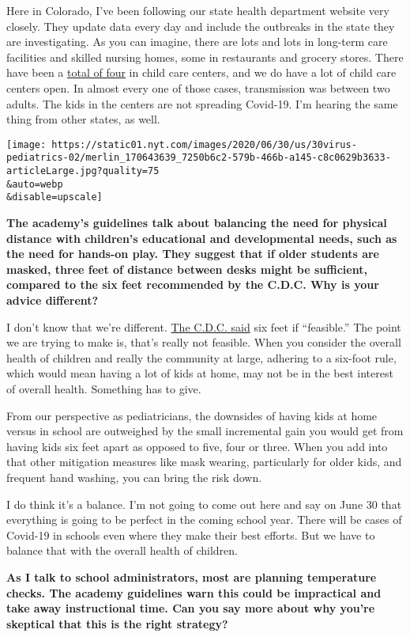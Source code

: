 Here in Colorado, I've been following our state health department
website very closely. They update data every day and include the
outbreaks in the state they are investigating. As you can imagine, there
are lots and lots in long-term care facilities and skilled nursing
homes, some in restaurants and grocery stores. There have been a
\href{https://covid19.colorado.gov/data/outbreak-data}{total of four} in
child care centers, and we do have a lot of child care centers open. In
almost every one of those cases, transmission was between two adults.
The kids in the centers are not spreading Covid-19. I'm hearing the same
thing from other states, as well.

\texttt{[image: https://static01.nyt.com/images/2020/06/30/us/30virus-pediatrics-02/merlin\_170643639\_7250b6c2-579b-466b-a145-c8c0629b3633-articleLarge.jpg?quality=75\\\&auto=webp\\\&disable=upscale]}

\textbf{The academy's guidelines talk about balancing the need for
physical distance with children's educational and developmental needs,
such as the need for hands-on play. They suggest that if older students
are masked, three feet of distance between desks might be sufficient,
compared to the six feet recommended by the C.D.C. Why is your advice
different?}

I don't know that we're different.
\href{https://www.cdc.gov/coronavirus/2019-ncov/community/schools-childcare/schools.html}{The
C.D.C. said} six feet if ``feasible.'' The point we are trying to make
is, that's really not feasible. When you consider the overall health of
children and really the community at large, adhering to a six-foot rule,
which would mean having a lot of kids at home, may not be in the best
interest of overall health. Something has to give.

From our perspective as pediatricians, the downsides of having kids at
home versus in school are outweighed by the small incremental gain you
would get from having kids six feet apart as opposed to five, four or
three. When you add into that other mitigation measures like mask
wearing, particularly for older kids, and frequent hand washing, you can
bring the risk down.

I do think it's a balance. I'm not going to come out here and say on
June 30 that everything is going to be perfect in the coming school
year. There will be cases of Covid-19 in schools even where they make
their best efforts. But we have to balance that with the overall health
of children.

\textbf{As I talk to school administrators, most are planning
temperature checks. The academy guidelines warn this could be
impractical and take away instructional time. Can you say more about why
you're skeptical that this is the right strategy?}

